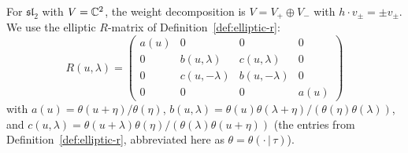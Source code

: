 For $\mathfrak{sl}_2$ with $V = \mathbb{C}^2$, the weight decomposition
is $V = V_+ \oplus V_-$ with $h \cdot v_\pm = \pm v_\pm$.
We use the elliptic $R$-matrix of Definition~\ref{def:elliptic-r}:
\begin{equation}\label{eq:sl2-r-matrix-entries}
R(u, \lambda) =
\begin{pmatrix}
a(u) & 0 & 0 & 0 \\
0 & b(u, \lambda) & c(u, \lambda) & 0 \\
0 & c(u, -\lambda) & b(u, -\lambda) & 0 \\
0 & 0 & 0 & a(u)
\end{pmatrix}
\end{equation}
with $a(u) = \theta(u+\eta)/\theta(\eta)$,
$b(u,\lambda) = \theta(u)\theta(\lambda+\eta)/\allowbreak
(\theta(\eta)\theta(\lambda))$, and
$c(u,\lambda) = \theta(u+\lambda)\theta(\eta)/\allowbreak
(\theta(\lambda)\theta(u+\eta))$
(the entries from Definition~\ref{def:elliptic-r},
abbreviated here as $\theta = \theta(\cdot\,|\,\tau)$).


